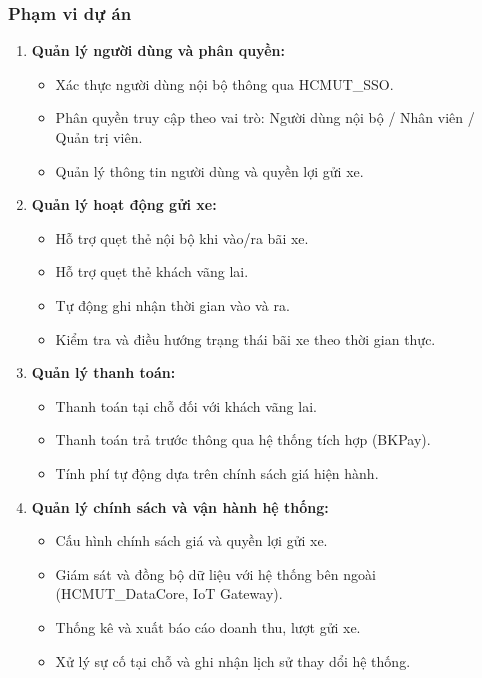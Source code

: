 \subsubsection{Phạm vi dự án}
\begin{enumerate}

\item \textbf{Quản lý người dùng và phân quyền:}
\begin{itemize}
    \item Xác thực người dùng nội bộ thông qua HCMUT\_SSO.
    \item Phân quyền truy cập theo vai trò: Người dùng nội bộ / Nhân viên / Quản trị viên.
    \item Quản lý thông tin người dùng và quyền lợi gửi xe.
\end{itemize}

\item \textbf{Quản lý hoạt động gửi xe:}
\begin{itemize}
    \item Hỗ trợ quẹt thẻ nội bộ khi vào/ra bãi xe.
    \item Hỗ trợ quẹt thẻ khách vãng lai.
    \item Tự động ghi nhận thời gian vào và ra.
    \item Kiểm tra và điều hướng trạng thái bãi xe theo thời gian thực.
\end{itemize}

\item \textbf{Quản lý thanh toán:}
\begin{itemize}
    \item Thanh toán tại chỗ đối với khách vãng lai.
    \item Thanh toán trả trước thông qua hệ thống tích hợp (BKPay).
    \item Tính phí tự động dựa trên chính sách giá hiện hành.
\end{itemize}

\item \textbf{Quản lý chính sách và vận hành hệ thống:}
\begin{itemize}
    \item Cấu hình chính sách giá và quyền lợi gửi xe.
    \item Giám sát và đồng bộ dữ liệu với hệ thống bên ngoài (HCMUT\_DataCore, IoT Gateway).
    \item Thống kê và xuất báo cáo doanh thu, lượt gửi xe.
    \item Xử lý sự cố tại chỗ và ghi nhận lịch sử thay dổi hệ thống.
\end{itemize}

\end{enumerate}
\newpage  
